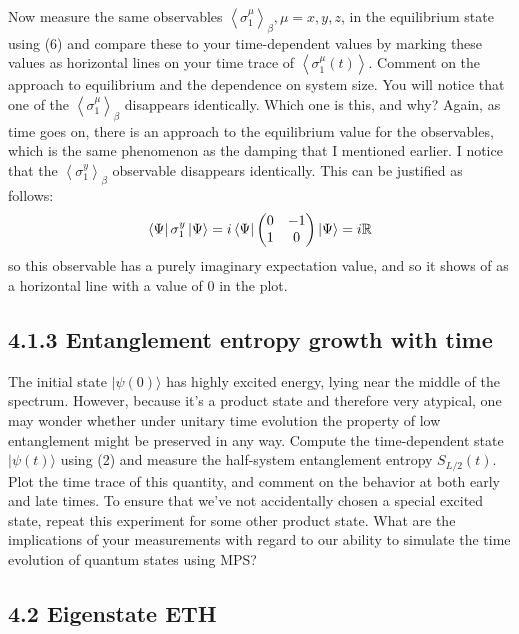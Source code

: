 \documentclass[12pt]{article}
\begin{document}
Now measure the same observables $\left\langle\sigma_{1}^{\mu}\right\rangle_{\beta}, \mu=x, y, z$, in the equilibrium state using (6) and compare these to your time-dependent values by marking these values as horizontal lines on your time trace of $\left\langle\sigma_{1}^{\mu}(t)\right\rangle$. Comment on the approach to equilibrium and the dependence on system size. You will notice that one of the $\left\langle\sigma_{1}^{\mu}\right\rangle_{\beta}$ disappears identically. Which one is this, and why?
\newpage
Again, as time goes on, there is an approach to the equilibrium value for the observables, which is the same phenomenon as the damping that I mentioned earlier. I notice that the $\left\langle\sigma_{1}^{y}\right\rangle_{\beta}$ observable disappears identically. This can be justified as follows:
\begin{equation}
\bra{\Psi } \sigma_{1}^{y} \ket{\Psi} = i \bra{\Psi } 
\begin{pmatrix}
0 & -1 \\
1 & 0
\end{pmatrix}
\ket{\Psi} = i \mathbb{R}
\end{equation}
so this observable has a purely imaginary expectation value, and so it shows of as a horizontal line with a value of 0 in the plot.
\subsection*{4.1.3 Entanglement entropy growth with time}
The initial state $|\psi(0)\rangle$ has highly excited energy, lying near the middle of the spectrum. However, because it's a product state and therefore very atypical, one may wonder whether under unitary time evolution the property of low entanglement might be preserved in any way. Compute the time-dependent state $|\psi(t)\rangle$ using (2) and measure the half-system entanglement entropy $S_{L / 2}(t)$. Plot the time trace of this quantity, and comment on the behavior at both early and late times. To ensure that we've not accidentally chosen a special excited state, repeat this experiment for some other product state. What are the implications of your measurements with regard to our ability to simulate the time evolution of quantum states using MPS?

\subsection*{4.2 Eigenstate ETH}
\end{document}
